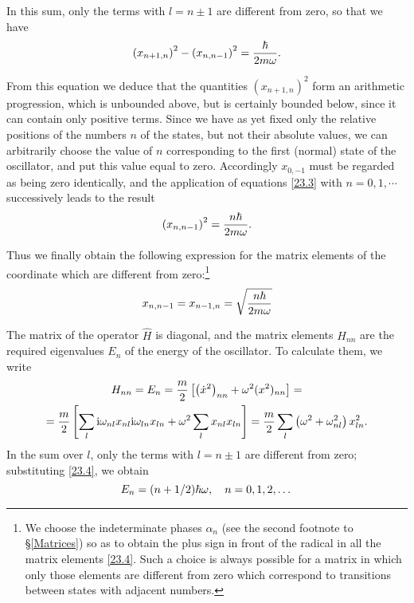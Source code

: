 In this sum, only the terms with $ l = n \pm 1 $ are different from zero, so that we have
\begin{equation}\label{23.3}
\left(x_{n+1,n}\right)^2-\left(x_{n,n-1}\right)^2=\frac{\hbar}{2m\omega}.
\end{equation}


From this equation we deduce that the quantities $  \left(x_{n+1,n}\right)^2$ form an arithmetic progression, which is unbounded above, but is certainly bounded below, since it can contain only positive terms. Since we have as yet fixed only the relative positions of the numbers $ n $ of the states, but not their absolute values, we can arbitrarily choose the value of $ n $ corresponding to the first (normal) state of the oscillator, and put this value equal to zero. Accordingly $ x_{0,-1} $ must be regarded as being zero identically, and the application of equations \eqref{23.3} with $ n = 0, 1,\cdots $ successively leads to the result
\[ \left(x_{n,n-1}\right)^2=\frac{n\hbar}{2m\omega} .\]



Thus we finally obtain the following expression for the matrix elements of the coordinate which are different from zero:\footnote{We choose the indeterminate phases $\alpha_n$ (see the second footnote to \S\ref{Matrices}) so as to obtain the plus sign in front of the radical in all the matrix elements \eqref{23.4}. Such a choice is always possible for a matrix in which only those elements are different from zero which correspond to transitions between states with adjacent numbers.
}
\begin{equation}\label{23.4}
x_{n,n-1}=x_{n-1,n}=\sqrt{\frac{n\hbar}{2m\omega}}
\end{equation}


The matrix of the operator $\hat{H}$ is diagonal, and the matrix elements $ H_{nn} $ are the required eigenvalues $ E_n $ of the energy of the oscillator. To calculate them, we write
\begin{multline*}
H_{nn}=E_n=\frac{m}{2}\left[ \left(\dot{x}^2\right)_{nn}+\omega^2(x^2)_{nn}\right]=\\
=\frac{m}{2}\left[\sum_l\mathrm{i}\omega_{nl}x_{nl}\mathrm{i}\omega_{ln}x_{ln}+\omega^2\sum_lx_{nl}x_{ln}  \right]=\frac{m}{2}\sum_{l}\left(\omega^2+\omega_{nl}^2\right)x_{ln}^2.
\end{multline*}
In the sum over $ l $, only the terms with $ l = n\pm1 $ are different from zero; substituting \eqref{23.4}, we obtain
\begin{equation}\label{23.5}
E_n=(n+1/2)\hbar\omega,\quad n=0,1,2,\dots
\end{equation}


